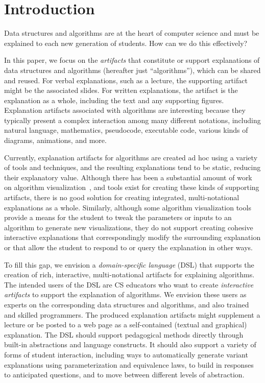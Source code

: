 \documentclass[conference]{IEEEtran}
\begin{document}
\section{Introduction}
\label{sec:intro}

Data structures and algorithms are at the heart of computer science and must be
explained to each new generation of students. How can we do this effectively?


In this paper, we focus on the \emph{artifacts} that constitute or support
explanations of data structures and algorithms (hereafter just ``algorithms''),
which can be shared and reused.
%
For verbal explanations, such as a lecture, the supporting artifact might be
the associated slides. For written explanations, the artifact is the
explanation as a whole, including the text and any supporting figures.
%
Explanation artifacts associated with algorithms are interesting because they
typically present a complex interaction among many different notations,
including natural language, mathematics, pseudocode, executable code, various
kinds of diagrams, animations, and more.


Currently, explanation artifacts for algorithms are created ad hoc using a
variety of tools and techniques, and the resulting explanations tend to be
static, reducing their explanatory value.
%
Although there has been a substantial amount of work on algorithm
visualization~\cite{Gloor92,Gloor97,HDS02,?}, and tools exist for creating
these kinds of supporting artifacts, there is no good solution for creating
integrated, multi-notational explanations as a whole. Similarly, although some
algorithm visualization tools provide a means for the student to tweak the
parameters or inputs to an algorithm to generate new visualizations, they do
not support creating cohesive interactive explanations that correspondingly
modify the surrounding explanation or that allow the student to respond to or
query the explanation in other ways.


To fill this gap, we envision a \emph{domain-specific language} (DSL) that
supports the creation of rich, interactive, multi-notational artifacts for
explaining algorithms. 
%
The intended users of the DSL are CS educators who want to create
\emph{interactive artifacts} to support the explanation of algorithms. We
envision these users as experts on the corresponding data structures and
algorithms, and also trained and skilled programmers. The produced explanation
artifacts might supplement a lecture or be posted to a web page as a
self-contained (textual and graphical) explanation.
%
The DSL should support pedagogical methods directly through built-in
abstractions and language constructs. It should also support a variety of forms
of student interaction, including ways to automatically generate variant
explanations using parameterization and equivalence laws, to build in responses
to anticipated questions, and to move between different levels of abstraction.
\end{document}
